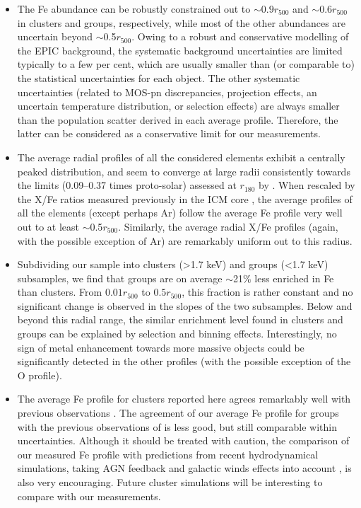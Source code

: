\documentclass{aa}
\begin{document}
\begin{itemize}

\item The Fe abundance can be robustly constrained out to $\sim 0.9 r_{500}$ and $\sim 0.6 r_{500}$ in clusters and groups, respectively, while most of the other abundances are uncertain beyond $\sim$0.5$r_{500}$. Owing to a robust and conservative modelling of the EPIC background, the systematic background uncertainties are limited typically to a few per cent, which are usually smaller than (or comparable to) the statistical uncertainties for each object. The other systematic uncertainties (related to MOS-pn discrepancies, projection effects, an uncertain temperature distribution, or selection effects) are always smaller than the population scatter derived in each average profile. Therefore, the latter can be considered as a conservative limit for our measurements. 

\item The average radial profiles of all the considered elements exhibit a centrally peaked distribution, and seem to converge at large radii consistently towards the limits (0.09--0.37 times proto-solar) assessed at $r_{180}$ by \citet{2016A&A...586A..32M}. When rescaled by the X/Fe ratios measured previously in the ICM core \citep{2016A&A...592A.157M}, the average profiles of all the elements (except perhaps Ar) follow the average Fe profile very well out to at least $\sim$0.5$r_{500}$. Similarly, the average radial X/Fe profiles (again, with the possible exception of Ar) are remarkably uniform out to this radius.

\item Subdividing our sample into clusters (>1.7 keV) and groups (<1.7 keV) subsamples, we find that groups are on average $\sim$21\% less enriched in Fe than clusters. From $0.01 r_{500}$ to $0.5 r_{500}$, this fraction is rather constant and no significant change is observed in the slopes of the two subsamples. Below and beyond this radial range, the similar enrichment level found in clusters and groups can be explained by selection and binning effects. Interestingly, no sign of metal enhancement towards more massive objects could be significantly detected in the other profiles (with the possible exception of the O profile).

\item The average Fe profile for clusters reported here agrees remarkably well with previous observations \citep{2008A&A...487..461L,2009MNRAS.395..764S,2011A&A...527A.134M}. The agreement of our average Fe profile for groups with the previous observations of \citet{2007MNRAS.380.1554R} is less good, but still comparable within uncertainties. Although it should be treated with caution, the comparison of our measured Fe profile with predictions from recent hydrodynamical simulations, taking AGN feedback and galactic winds effects into account \citep{2014MNRAS.438..195P,2015ApJ...813L..17R}, is also very encouraging. Future cluster simulations will be interesting to compare with our measurements.


\end{itemize}
\end{document}
